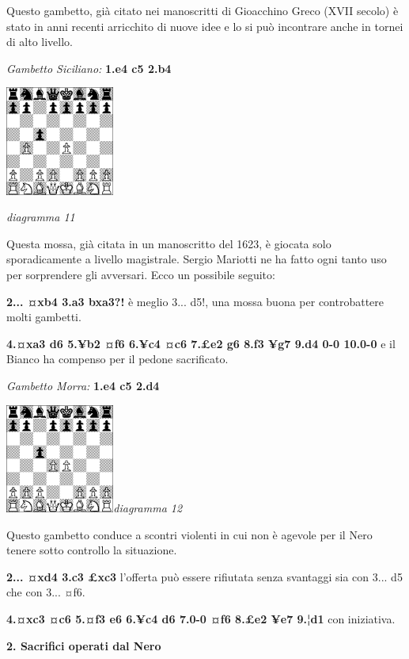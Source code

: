 \documentclass[
]{article}
\begin{document}
Questo gambetto, già citato nei manoscritti di Gioacchino Greco (XVII
secolo) è stato in anni recenti arricchito di nuove idee e lo si può
incontrare anche in tornei di alto livello.

\emph{Gambetto Siciliano:} \textbf{1.e4 c5 2.b4}

\includegraphics[width=1.40972in,height=1.40972in]{vertopal_109f12be458a423d8f3cc838880eaea2/media/image11.png}

\emph{diagramma 11}

Questa mossa, già citata in un manoscritto del 1623, è giocata solo
sporadicamente a livello magistrale. Sergio Mariotti ne ha fatto ogni
tanto uso per sorprendere gli avversari. Ecco un possibile seguito:

\textbf{2... ¤xb4 3.a3 bxa3?!} è meglio 3... d5!, una mossa buona per
controbattere molti gambetti.

\textbf{4.¤xa3 d6 5.¥b2 ¤f6 6.¥c4 ¤c6 7.£e2 g6 8.f3 ¥g7 9.d4 0-0 10.0-0}
e il Bianco ha compenso per il pedone sacrificato.

\emph{Gambetto Morra:} \textbf{1.e4 c5 2.d4}

\includegraphics[width=1.40972in,height=1.40972in]{vertopal_109f12be458a423d8f3cc838880eaea2/media/image12.png}\emph{diagramma
12}

Questo gambetto conduce a scontri violenti in cui non è agevole per il
Nero tenere sotto controllo la situazione.

\textbf{2... ¤xd4 3.c3 £xc3} l'offerta può essere rifiutata senza
svantaggi sia con 3... d5 che con 3... ¤f6.

\textbf{4.¤xc3 ¤c6 5.¤f3 e6 6.¥c4 d6 7.0-0 ¤f6 8.£e2 ¥e7 9.¦d1} con
iniziativa.

\textbf{2. Sacrifici operati dal Nero}
\end{document}
